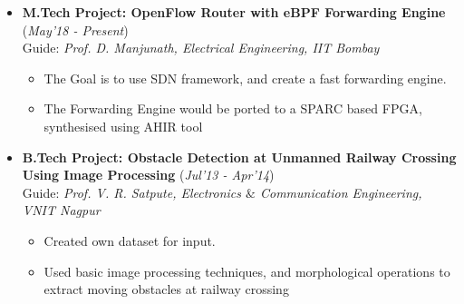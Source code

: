\documentclass[10pt]{article}
\begin{document}
\colorbox{bl}{}%
\vspace{-0.05cm}
\begin{itemize}[leftmargin=0.4cm]
\item \textbf{M.Tech Project: OpenFlow Router with eBPF Forwarding Engine}
\hfill{(\textit{May'18 - Present})} \\
Guide: \textit{Prof. D. Manjunath, Electrical Engineering, IIT Bombay}\\
\vspace{-0.68cm}
\begin{itemize}
\item The Goal is to use SDN framework, and create a fast forwarding engine.\vspace{-0.1cm}
\item The Forwarding Engine would be ported to a SPARC based FPGA, synthesised using AHIR tool
\end{itemize}
\vspace{-0.2cm}
\item\textbf{B.Tech Project: Obstacle Detection at Unmanned Railway Crossing \\Using Image Processing}
\hfill{(\textit{Jul'13 - Apr'14})} \\
Guide: \textit{Prof. V. R. Satpute, Electronics $\&$ Communication Engineering, VNIT Nagpur}\\
\vspace{-0.68cm}
\begin{itemize}
	\item Created own dataset for input.
	\vspace{-0.1cm}
	\item Used basic image processing techniques, and morphological operations to extract moving obstacles at railway crossing
\end{itemize}
\vspace{-0.2cm}

\end{itemize}
\end{document}
